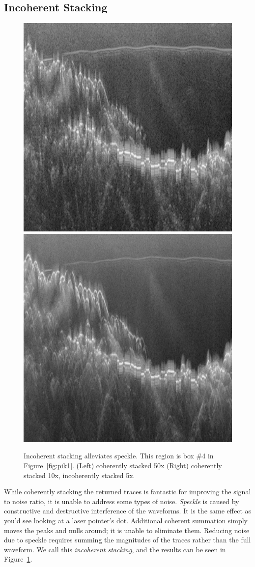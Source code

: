 \documentclass[11pt]{article}
\newcommand{\figref}[1]{Figure~\ref{#1}}
\begin{document}
\subsection{Incoherent Stacking}

\begin{figure}[ht!]
\centering
\includegraphics[width=0.48\columnwidth]{figures/TOT_costacked_zoom3_small.jpg}
\includegraphics[width=0.48\columnwidth]{figures/TOT_stacked_zoom3_small.jpg}
\caption[]{Incoherent stacking alleviates speckle. This region is box \#4 in \figref{fig:pik1}. (Left) coherently stacked 50x (Right) coherently stacked 10x, incoherently stacked 5x.}
\label{fig:incoherent_stacking}
\end{figure}

While coherently stacking the returned traces is fantastic for improving the signal to noise ratio, it is unable to address some types of noise.
\emph{Speckle} is caused by constructive and destructive interference of the waveforms. It is the same effect as you'd see looking at a laser pointer's dot. Additional coherent summation simply moves the peaks and nulls around; it is unable to eliminate them. Reducing noise due to speckle requires summing the magnitudes of the traces rather than the full waveform. We call this \emph{incoherent stacking}, and the results can be seen in \figref{fig:incoherent_stacking}.
\end{document}
